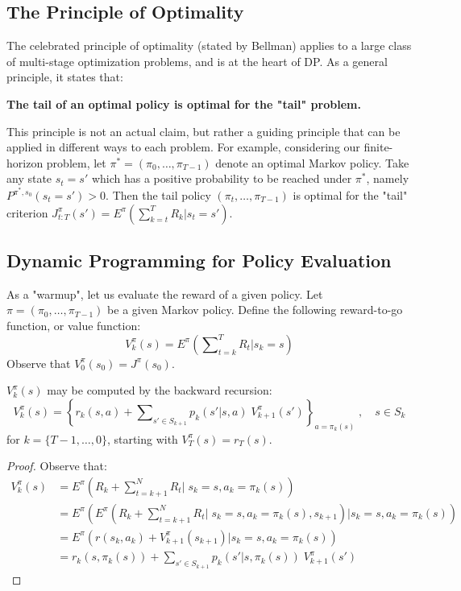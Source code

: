 \subsection{The Principle of Optimality}
The celebrated principle of optimality (stated by Bellman) applies to a large class of multi-stage optimization problems, and is at the heart of DP. As a general principle, it states that:
\begin{center}
\textbf{The tail of an optimal policy is optimal for the "tail" problem.}
\end{center}

This principle is not an actual claim, but rather a guiding principle that can be applied in different ways to each problem.
For example, considering our finite-horizon problem, let ${\pi ^*} = ({\pi _0}, \ldots ,{\pi _{T - 1}})$ denote an optimal Markov policy. Take any state ${s_t} = s'$ which has a positive probability to be reached under ${\pi ^*}$, namely ${P^{\pi^* ,{s_0}}}({s_t} = s') > 0$. Then the tail policy $({\pi _t}, \ldots ,{\pi _{T - 1}})$ is optimal for the "tail" criterion $J_{t:T}^\pi (s') = {E^\pi }\left( {\sum\nolimits_{k = t}^T {{R_k}|{s_t} = s'} } \right)$.


\subsection{Dynamic Programming for Policy Evaluation}\label{sss:pol_eval}
As a "warmup", let us evaluate the reward of a given policy.
Let $\pi  = ({\pi _0}, \ldots ,{\pi _{T - 1}})$ be a given Markov policy. Define the following reward-to-go function, or value function:
\[V_k^\pi (s) = {E^\pi }\left( {\sum\nolimits_{t = k}^T {{R_t}|{s_k} = s} } \right)\]
Observe that $V_0^\pi ({s_0}) = {J^\pi }({s_0})$.

\begin{lemma}\label{lem:finite_horizon_VI} $V_k^\pi (s)$ may be computed by the backward recursion:
\[V_k^\pi (s) = {\left\{ {{r_k}(s,a) + \sum\nolimits_{s' \in {S_{k + 1}}} {{p_k}(s'|s,a)} \;V_{k + 1}^\pi (s')} \right\}_{a = {\pi _k}(s)}}\;,\quad s \in {S_k}\]
for $k = \{ T - 1, \ldots ,0 \}$,  starting with  $V_T^\pi (s) = {r_T}(s)$.
\end{lemma}
\begin{proof}
Observe that:
\begin{align*}
V_k^\pi (s) &= {E^\pi }\left( {{R_k} + \sum\nolimits_{t = k + 1}^N {{R_t}|} \;{s_k} = s,{a_k} = {\pi _k}(s)} \right)\\
 &= {E^\pi }\left( {{E^\pi }\left( {{R_k} + \sum\nolimits_{t = k + 1}^N {{R_t}} |\;{s_k} = s,{a_k} = {\pi _k}(s),{s_{k + 1}}} \right)|{s_k} = s,{a_k} = {\pi _k}(s)} \right)\\
 &= {E^\pi }\left( {r({s_k},{a_k}) + V_{k + 1}^\pi ({s_{k + 1}})|{s_k} = s,{a_k} = {\pi _k}(s)} \right)\\
 &= {r_k}(s,{\pi _k}(s)) + \sum\nolimits_{s' \in {S_{k + 1}}} {{p_k}(s'|s,{\pi _k}(s))} \;V_{k + 1}^\pi (s')
\end{align*}
\end{proof}
